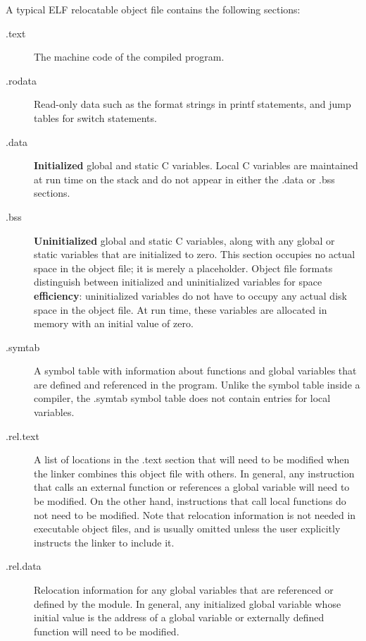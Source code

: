 \documentclass[11pt]{article}
\begin{document}
A typical ELF relocatable object file contains the following sections:\\
\begin{description}
\item[{.text}] The machine code of the compiled program.\\
\item[{.rodata}] Read-only data such as the format strings in printf statements, and jump tables for switch statements.\\
\item[{.data}] \textbf{Initialized} global and static C variables. Local C variables are maintained at run time on the stack and do not appear in either the .data or .bss sections.\\
\item[{.bss}] \textbf{Uninitialized} global and static C variables, along with any global or static variables that are initialized to zero. This section occupies no actual space in the object file; it is merely a placeholder. Object file formats distinguish between initialized and uninitialized variables for space \textbf{efficiency}: uninitialized variables do not have to occupy any actual disk space in the object file. At run time, these variables are allocated in memory with an initial value of zero.\\
\item[{.symtab}] A symbol table with information about functions and global variables that are defined and referenced in the program. Unlike the symbol table inside a compiler, the .symtab symbol table does not contain entries for local variables.\\
\item[{.rel.text}] A list of locations in the .text section that will need to be modified when the linker combines this object file with others. In general, any instruction that calls an external function or references a global variable will need to be modified. On the other hand, instructions that call local functions do not need to be modified. Note that relocation information is not needed in executable object files, and is usually omitted unless the user explicitly instructs the linker to include it.\\
\item[{.rel.data}] Relocation information for any global variables that are referenced or defined by the module. In general, any initialized global variable whose initial value is the address of a global variable or externally defined function will need to be modified.\\

\end{description}
\end{document}
